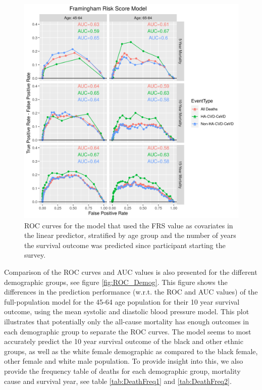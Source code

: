 \documentclass[
]{article}
\begin{document}
\begin{figure}
\centering
\includegraphics{./Rmarkdown_Plots/ROC_FRSModel_CAx-EventType.png}
\caption{ROC curves for the model that used the FRS value as covariates in the linear predictor, stratified by age group and the number of years the survival outcome was predicted since participant starting the survey.}\label{fig:ROC_FRS}
\end{figure}

Comparison of the ROC curves and AUC values is also presented for the different demographic groups, see figure \ref{fig:ROC_Demog}. This figure shows the differences in the prediction performance (w.r.t. the ROC and AUC values) of the full-population model for the 45-64 age population for their 10 year survival outcome, using the mean systolic and diastolic blood pressure model. This plot illustrates that potentially only the all-cause mortality has enough outcomes in each demographic group to separate the ROC curves. The model seems to most accurately predict the 10 year survival outcome of the black and other ethnic groups, as well as the white female demographic as compared to the black female, other female and white male population. To provide insight into this, we also provide the frequency table of deaths for each demographic group, mortality cause and survival year, see table \ref{tab:DeathFreq1} and \ref{tab:DeathFreq2}.
\end{document}
